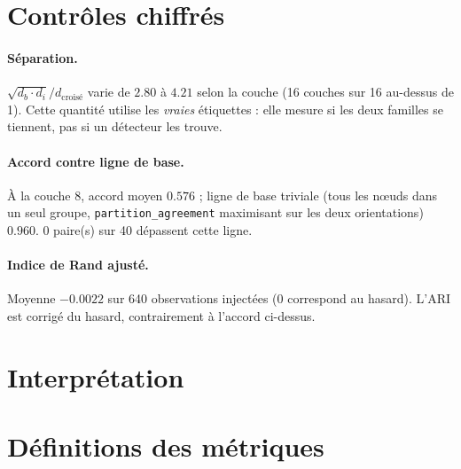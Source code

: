 \documentclass[11pt,a4paper]{article}
\begin{document}
\section{Contrôles chiffrés}


\paragraph{Séparation.} $\sqrt{d_b \cdot d_i} / d_{\text{croisé}}$ varie
de $2.80$ à $4.21$ selon la couche
(16 couches sur 16 au-dessus de 1).
Cette quantité utilise les \emph{vraies} étiquettes : elle mesure si les deux
familles se tiennent, pas si un détecteur les trouve.



\paragraph{Accord contre ligne de base.} À la couche 8, accord moyen
$0.576$ ; ligne de base triviale (tous les n\oe uds dans
un seul groupe, \texttt{partition\_agreement} maximisant sur les deux
orientations) $0.960$.
0 paire(s) sur 40 dépassent cette ligne.



\paragraph{Indice de Rand ajusté.} Moyenne $-0.0022$ sur
640 observations injectées (0 correspond au hasard). L'ARI est corrigé
du hasard, contrairement à l'accord ci-dessus.


\section{Interprétation}



\section{Définitions des métriques}
\end{document}
